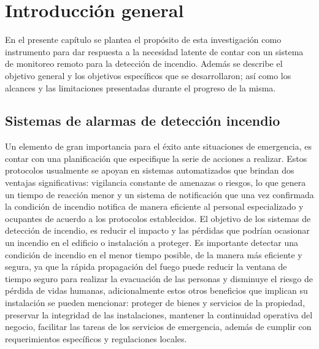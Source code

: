 
\chapter{Introducción general} %

\label{Chapter1} %
\label{IntroGeneral}


\newcommand{\keyword}[1]{\textbf{#1}}
\newcommand{\tabhead}[1]{\textbf{#1}}
\newcommand{\code}[1]{\texttt{#1}}
\newcommand{\file}[1]{\texttt{\bfseries#1}}
\newcommand{\option}[1]{\texttt{\itshape#1}}
\newcommand{\grados}{$^{\circ}$}


En el presente capítulo se plantea el propósito de esta investigación como instrumento para dar respuesta a la necesidad latente de contar con un sistema de monitoreo remoto para la detección de incendio. Además se describe el objetivo general y los objetivos específicos que se desarrollaron; así como los alcances y las limitaciones presentadas durante el progreso de la misma.


\section{Sistemas de alarmas de detección incendio}

Un elemento de gran importancia para el éxito ante situaciones de emergencia, es contar con una planificación que especifique la serie de acciones a realizar. Estos protocolos usualmente se apoyan en sistemas automatizados que brindan dos ventajas significativas: vigilancia constante de amenazas o riesgos, lo que genera un tiempo de reacción menor  y un sistema de notificación que una vez confirmada la condición de incendio notifica de manera eficiente al personal especializado y ocupantes de acuerdo a los protocolos establecidos.
El objetivo de los sistemas de detección de incendio, es reducir el impacto y las pérdidas que podrían ocasionar un incendio en el edificio o instalación a proteger. Es importante detectar una condición de incendio en el menor tiempo posible, de la manera más eficiente y segura, ya que la rápida propagación del fuego puede reducir la ventana de tiempo seguro para realizar la evacuación de las personas y disminuye el riesgo de pérdida de vidas humanas, adicionalmente estos otros beneficios que implican su instalación se pueden mencionar: proteger de bienes y servicios de la propiedad, preservar la integridad de las instalaciones, mantener la continuidad operativa del negocio, facilitar las tareas de los servicios de emergencia, además de cumplir con requerimientos específicos y regulaciones locales.

